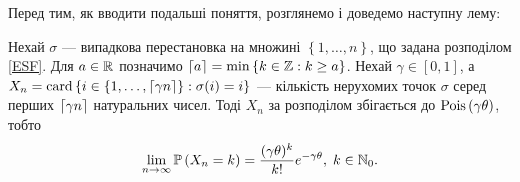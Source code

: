 Перед тим, як вводити подальші поняття, розглянемо і доведемо наступну лему:
\begin{lemma}\label{main_lemma}
    Нехай $\sigma$ --- випадкова перестановка на множині
    $\left\{1, \dots, n\right\}$, що задана розподілом \eqref{ESF}.
    Для $a \in \R$ позначимо $\ceil*{a} = \min\left\{k\in\Z : k \geq a\right\}$.
    Нехай $\gamma \in [0, 1]$, а
    $X_n = \card\left\{i\in \left\{1,\dots,\ceil*{\gamma n} \right\} : \sigma(i) = i\right\}$
    --- кількість нерухомих точок
    $\sigma$ серед перших $\ceil*{\g n}$ натуральних чисел.
    Тоді $X_n$ за розподілом збігається до $\Poiss{\gamma\theta}$, тобто
    \begin{gather}
        \lim_{n\to\infty} \P{X_n = k} = \frac{(\gamma\theta)^k}{k!}e^{-\gamma\theta}, \; k \in \N_0.
    \end{gather} 
\end{lemma}
